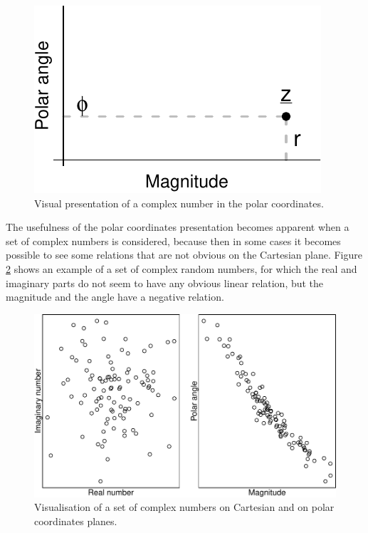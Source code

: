 \documentclass[
]{book}
\begin{document}
\begin{figure}
\centering
\includegraphics{Svetunkov---Svetunkov---Complex-Dynamic-Models_files/figure-latex/complexPlanePolar-1.pdf}
\caption{\label{fig:complexPlanePolar}Visual presentation of a complex number in the polar coordinates.}
\end{figure}

The usefulness of the polar coordinates presentation becomes apparent when a set of complex numbers is considered, because then in some cases it becomes possible to see some relations that are not obvious on the Cartesian plane. Figure \ref{fig:complexCartesianvsPolar} shows an example of a set of complex random numbers, for which the real and imaginary parts do not seem to have any obvious linear relation, but the magnitude and the angle have a negative relation.

\begin{figure}
\centering
\includegraphics{Svetunkov---Svetunkov---Complex-Dynamic-Models_files/figure-latex/complexCartesianvsPolar-1.pdf}
\caption{\label{fig:complexCartesianvsPolar}Visualisation of a set of complex numbers on Cartesian and on polar coordinates planes.}
\end{figure}
\end{document}
